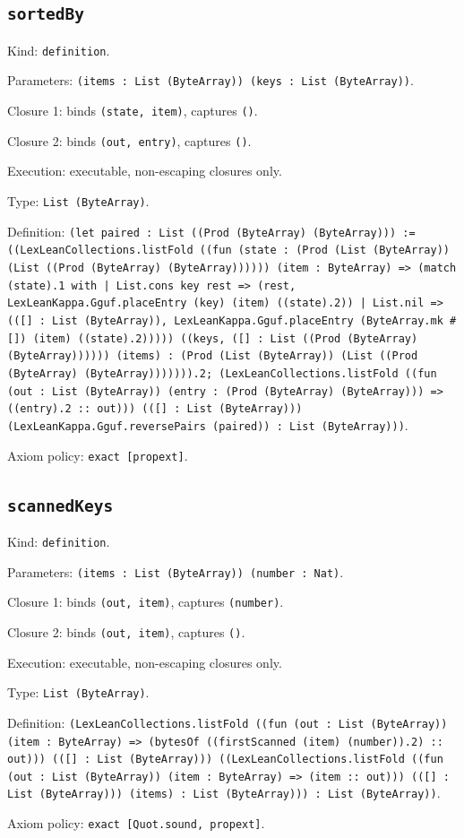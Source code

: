 \documentclass[11pt]{article}
\begin{document}
\subsection*{\texttt{sortedBy}}
\noindent Kind: \texttt{definition}.\par
\noindent Parameters: \texttt{(items : List (ByteArray)) (keys : List (ByteArray))}.\par
\noindent Closure 1: binds \texttt{(state, item)}, captures \texttt{()}.\par
\noindent Closure 2: binds \texttt{(out, entry)}, captures \texttt{()}.\par
\noindent Execution: executable, non-escaping closures only.\par
\noindent Type: \texttt{List (ByteArray)}.\par
\noindent Definition: \texttt{(let paired : List ((Prod (ByteArray) (ByteArray))) := ((LexLeanCollections.listFold ((fun (state : (Prod (List (ByteArray)) (List ((Prod (ByteArray) (ByteArray)))))) (item : ByteArray) => (match (state).1 with | List.cons key rest => (rest, LexLeanKappa.Gguf.placeEntry (key) (item) ((state).2)) | List.nil => (([] : List (ByteArray)), LexLeanKappa.Gguf.placeEntry (ByteArray.mk \#[]) (item) ((state).2))))) ((keys, ([] : List ((Prod (ByteArray) (ByteArray)))))) (items) : (Prod (List (ByteArray)) (List ((Prod (ByteArray) (ByteArray))))))).2; (LexLeanCollections.listFold ((fun (out : List (ByteArray)) (entry : (Prod (ByteArray) (ByteArray))) => ((entry).2 :: out))) (([] : List (ByteArray))) (LexLeanKappa.Gguf.reversePairs (paired)) : List (ByteArray)))}.\par
\noindent Axiom policy: \texttt{exact [propext]}.\par
\subsection*{\texttt{scannedKeys}}
\noindent Kind: \texttt{definition}.\par
\noindent Parameters: \texttt{(items : List (ByteArray)) (number : Nat)}.\par
\noindent Closure 1: binds \texttt{(out, item)}, captures \texttt{(number)}.\par
\noindent Closure 2: binds \texttt{(out, item)}, captures \texttt{()}.\par
\noindent Execution: executable, non-escaping closures only.\par
\noindent Type: \texttt{List (ByteArray)}.\par
\noindent Definition: \texttt{(LexLeanCollections.listFold ((fun (out : List (ByteArray)) (item : ByteArray) => (bytesOf ((firstScanned (item) (number)).2) :: out))) (([] : List (ByteArray))) ((LexLeanCollections.listFold ((fun (out : List (ByteArray)) (item : ByteArray) => (item :: out))) (([] : List (ByteArray))) (items) : List (ByteArray))) : List (ByteArray))}.\par
\noindent Axiom policy: \texttt{exact [Quot.sound, propext]}.\par
\end{document}
